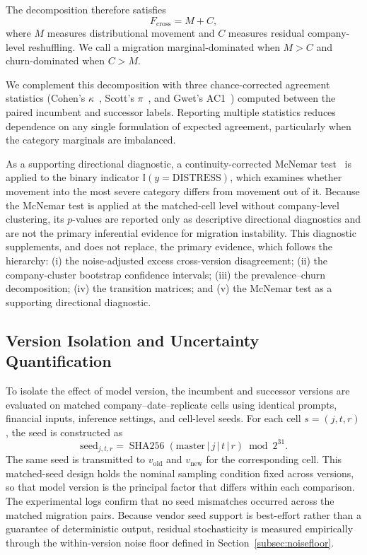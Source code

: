 \documentclass[11pt]{article}
\begin{document}
The decomposition therefore satisfies
\begin{equation}
F_{\mathrm{cross}}=M+C,
\end{equation}
where $M$ measures distributional movement and $C$ measures residual company-level reshuffling. We call a migration marginal-dominated when $M>C$ and churn-dominated when $C>M$.

We complement this decomposition with three chance-corrected agreement statistics (Cohen's $\kappa$~\cite{cohen}, Scott's $\pi$~\cite{scott}, and Gwet's AC1~\cite{gwet}) computed between the paired incumbent and successor labels. Reporting multiple statistics reduces dependence on any single formulation of expected agreement, particularly when the category marginals are imbalanced.

As a supporting directional diagnostic, a continuity-corrected McNemar test~\cite{mcnemar} is applied to the binary indicator $\mathbb{I}(y=\text{DISTRESS})$, which examines whether movement into the most severe category differs from movement out of it. Because the McNemar test is applied at the matched-cell level without company-level clustering, its $p$-values are reported only as descriptive directional diagnostics and are not the primary inferential evidence for migration instability. This diagnostic supplements, and does not replace, the primary evidence, which follows the hierarchy: (i) the noise-adjusted excess cross-version disagreement; (ii) the company-cluster bootstrap confidence intervals; (iii) the prevalence--churn decomposition; (iv) the transition matrices; and (v) the McNemar test as a supporting directional diagnostic.

\subsection{Version Isolation and Uncertainty Quantification}
To isolate the effect of model version, the incumbent and successor versions are evaluated on matched company--date--replicate cells using identical prompts, financial inputs, inference settings, and cell-level seeds. For each cell $s=(j,t,r)$, the seed is constructed as
\begin{equation}
\mathrm{seed}_{j,t,r} = \operatorname{SHA256}(\mathrm{master}\,|\,j\,|\,t\,|\,r) \bmod 2^{31}.
\end{equation}
The same seed is transmitted to $v_{\mathrm{old}}$ and $v_{\mathrm{new}}$ for the corresponding cell. This matched-seed design holds the nominal sampling condition fixed across versions, so that model version is the principal factor that differs within each comparison. The experimental logs confirm that no seed mismatches occurred across the matched migration pairs. Because vendor seed support is best-effort rather than a guarantee of deterministic output, residual stochasticity is measured empirically through the within-version noise floor defined in Section~\ref{subsec:noisefloor}.
\end{document}
